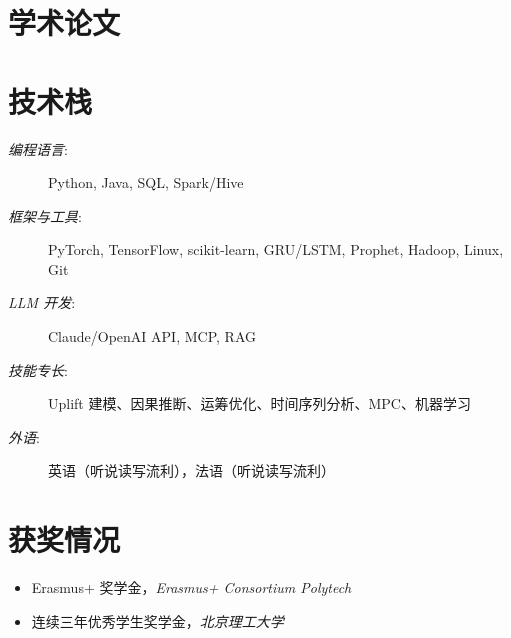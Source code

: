 \documentclass{mycv}
\begin{document}


\section{学术论文}


\vspace{-\parskip}

\section{技术栈}

\begin{description}
  \item[\textit{编程语言}:] Python, Java, SQL, Spark/Hive
  \item[\textit{框架与工具}:] PyTorch, TensorFlow, scikit-learn, GRU/LSTM, Prophet, Hadoop, Linux, Git
  \item[\textit{LLM 开发}:] Claude/OpenAI API, MCP, RAG
  \item[\textit{技能专长}:] Uplift 建模、因果推断、运筹优化、时间序列分析、MPC、机器学习
  \item[\textit{外语}:] 英语（听说读写流利），法语（听说读写流利）
\end{description}

\vspace{-\parskip}

\section{获奖情况}

\begin{itemize}
  \item Erasmus+ 奖学金，\textit{Erasmus+ Consortium Polytech} 
  \item 连续三年优秀学生奖学金，\textit{北京理工大学} 
\end{itemize}
\end{document}
